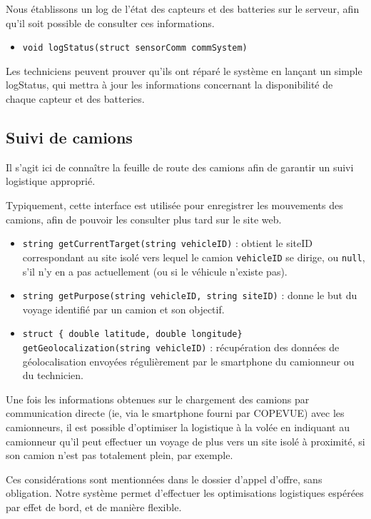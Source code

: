 Nous établissons un log de l'état des capteurs et des batteries sur le serveur, afin qu'il soit possible de consulter ces informations.

\begin{itemize}
\item \tt{void logStatus(struct sensorComm commSystem)}
\end{itemize}

Les techniciens peuvent prouver qu'ils ont réparé le système en lançant un simple logStatus, qui mettra à jour les informations concernant la disponibilité de chaque capteur et des batteries.


\subsection{Suivi de camions}

Il s'agit ici de connaître la feuille de route des camions afin de garantir un suivi logistique approprié.

Typiquement, cette interface est utilisée pour enregistrer les mouvements des camions, afin de pouvoir les consulter plus tard sur le site web.

\begin{itemize}
\item \texttt{string getCurrentTarget(string vehicleID)} : obtient le siteID correspondant au site isolé vers lequel le camion \texttt{vehicleID} se dirige, ou \texttt{null}, s'il n'y en a pas actuellement (ou si le véhicule n'existe pas).
\item \texttt{string getPurpose(string vehicleID, string siteID)} : donne le but du voyage identifié par un camion et son objectif.
\item \texttt{struct \{ double latitude, double longitude\} getGeolocalization(string vehicleID)} : récupération des données de géolocalisation envoyées régulièrement par le smartphone du camionneur ou du technicien.
\end{itemize}

Une fois les informations obtenues sur le chargement des camions par communication directe (ie, via le smartphone fourni par COPEVUE) avec les camionneurs, il est possible d'optimiser la logistique à la volée en indiquant au camionneur qu'il peut effectuer un voyage de plus vers un site isolé à proximité, si son camion n'est pas totalement plein, par exemple.

Ces considérations sont mentionnées dans le dossier d'appel d'offre, sans obligation. Notre système permet d'effectuer les optimisations logistiques espérées par effet de bord, et de manière flexible.

